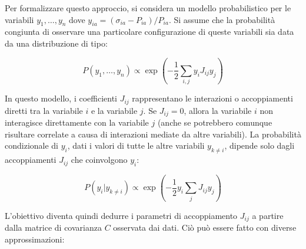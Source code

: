 Per formalizzare questo approccio, si considera un modello probabilistico per le variabili $y_1, \dots, y_n$ dove $y_{ia} = (\sigma_{ia} - P_{ia})/P_{ia}$. Si assume che la probabilità congiunta di osservare una particolare configurazione di queste variabili sia data da una distribuzione di tipo:

\begin{equation} \label{eq:ch25_3}
P(y_1, \dots, y_n) \propto \exp\left(-\frac{1}{2} \sum_{i,j} y_i J_{ij} y_j\right)
\end{equation}

In questo modello, i coefficienti $J_{ij}$ rappresentano le interazioni o accoppiamenti diretti tra la variabile $i$ e la variabile $j$. Se $J_{ij}=0$, allora la variabile $i$ non interagisce direttamente con la variabile $j$ (anche se potrebbero comunque risultare correlate a causa di interazioni mediate da altre variabili).
La probabilità condizionale di $y_i$, dati i valori di tutte le altre variabili $y_{k \neq i}$, dipende solo dagli accoppiamenti $J_{ij}$ che coinvolgono $y_i$: 

\begin{equation} \label{eq:ch25_4}
P(y_i | y_{k \neq i}) \propto \exp\left(-\frac{1}{2} y_i \sum_j J_{ij} y_j\right)
\end{equation}

L'obiettivo diventa quindi dedurre i parametri di accoppiamento $J_{ij}$ a partire dalla matrice di covarianza $C$ osservata dai dati. Ciò può essere fatto con diverse approssimazioni:

